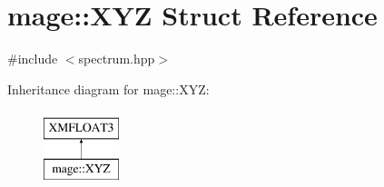 \hypertarget{structmage_1_1_x_y_z}{}\section{mage\+:\+:X\+YZ Struct Reference}
\label{structmage_1_1_x_y_z}


{\ttfamily \#include $<$spectrum.\+hpp$>$}

Inheritance diagram for mage\+:\+:X\+YZ\+:\begin{figure}[H]
\begin{center}
\leavevmode
\includegraphics[height=2.000000cm]{structmage_1_1_x_y_z}
\end{center}
\end{figure}
